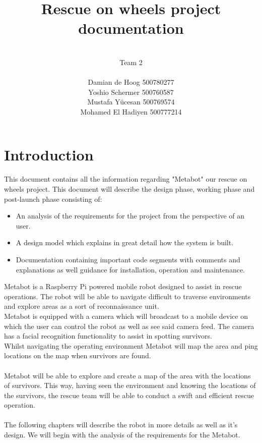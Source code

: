 \documentclass[12pt]{article}
\begin{document}
	\title{\huge Rescue on wheels project documentation}
	\author{\\Team 2\\ \\Damian de Hoog 500780277\\ Yoshio Schermer 500760587\\Mustafa Y\"{u}cesan 500769574\\ Mohamed El Hadiyen 500777214}
	\maketitle
	\newpage
	\tableofcontents
	\newpage
	\section{Introduction}
	This document contains all the information regarding "Metabot" our rescue on wheels project. This document will describe the design phase, working phase and post-launch phase consisting of:
	\begin{itemize}
		\item An analysis of the requirements for the project from the perspective of an user.
		\item A design model which explains in great detail how the system is built.
		\item Documentation containing important code segments with comments and explanations as well guidance for installation, operation and maintenance.
	\end{itemize} 
	Metabot is a Raspberry Pi powered mobile robot designed to assist in rescue operations. The robot will be able to navigate difficult to traverse environments and explore areas as a sort of reconnaissance unit.\\
	Metabot is equipped with a camera which will broadcast to a mobile device on which the user can control the robot as well as see said camera feed. The camera has a facial recognition functionality to assist in spotting survivors.\\
	Whilst navigating the operating environment Metabot will map the area and ping locations on the map when survivors are found.\\ 
	\\Metabot will be able to explore and create a map of the area with the locations of survivors. This way, having seen the environment and knowing the locations of the survivors,  the rescue team will be able to conduct a swift and efficient rescue operation.\\
	\\The following chapters will describe the robot in more details as well as it's design. We will begin with the analysis of the requirements for the Metabot. 
	\newpage
\end{document}
